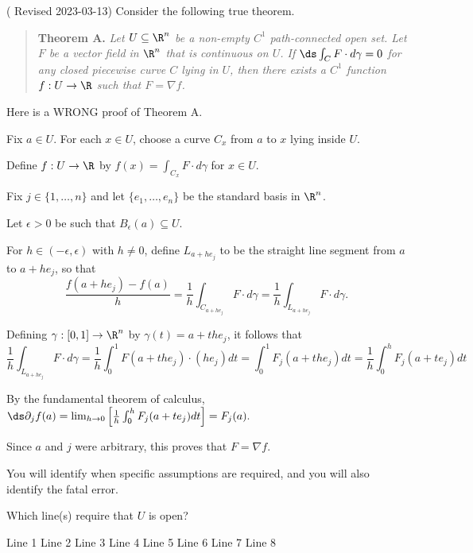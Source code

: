 \documentclass{exam}
\begin{document}
\begin{questions}
\pagebreak
\question ({\color{Yellow} Revised 2023-03-13}) Consider the following true theorem.
\begin{quote}
	\textbf{Theorem A.} \it Let $U \subseteq \R^n$ be a non-empty $C^1$ path-connected open set. Let $F$ be a vector field in $\R^n$ that is continuous on $U$. If $\ds \int_C F \cdot d\gamma = 0$ for any closed piecewise curve $C$ lying in $U$, then there exists a $C^1$ function $f : U \to \R$ such that $F = \nabla f$. 
\end{quote}
Here is a WRONG proof of Theorem A.   
\begin{lines}
	\item Fix $a \in U$. For each $x \in U$, choose a curve $C_x$ from $a$ to $x$ lying inside $U$. 
	\item Define $f : U \to \R$ by $f(x) = \int_{C_{x}} F \cdot d\gamma$ for $x \in U$. 
	\item Fix $j \in \{1,\dots,n\}$ and let $\{e_1,\dots,e_n\}$ be the standard basis in $\R^n$. 
	\item Let $\epsilon > 0$ be such that $B_{\epsilon}(a) \subseteq U$. 
	\item For $h \in (-\epsilon,\epsilon)$ with $h \neq 0$, define $L_{a+he_j}$ to be the straight line segment from $a$ to $a+he_j$, so that
		\[
		\frac{f(a+he_j)-f(a)}{h} = \frac{1}{h}\int_{C_{a+he_j}} F \cdot d\gamma = \frac{1}{h} \int_{L_{a+he_j}} F \cdot d\gamma . 	
		\]
	\item Defining $\gamma : [0,1] \to \R^n$ by $\gamma(t) = a + the_j$, it follows that
		\[
		\frac{1}{h} \int_{L_{a+he_j}} F \cdot d\gamma = \frac{1}{h} \int_0^1 F(a+the_j) \cdot (h e_j) dt =  \int_0^1 F_j(a+the_j) dt = \frac{1}{h} \int_0^h F_j(a+te_j) dt
		\]
	\item By the fundamental theorem of calculus, $\ds \partial_j f(a) =  \lim_{h \to 0} \left[ \frac{1}{h} \int_0^h F_j(a+te_j) dt \right] = F_j(a).$ 
	\item Since $a$ and $j$ were arbitrary, this proves that $F = \nabla f$. 
\end{lines}
You will identify when specific assumptions are required, and you will also identify the fatal error. 

\begin{parts}

\item Which line(s) require that $U$ is open? 

\CorrectChoiceBox
\begin{oneparcheckboxes}
	\choice Line 1
	\choice Line 2
	\choice Line 3
	\CorrectChoice Line 4
	\choice Line 5		
	\choice Line 6		
	\choice Line 7		
	\choice Line 8							
\end{oneparcheckboxes}
\medskip


\end{parts}
\end{questions}
\end{document}
